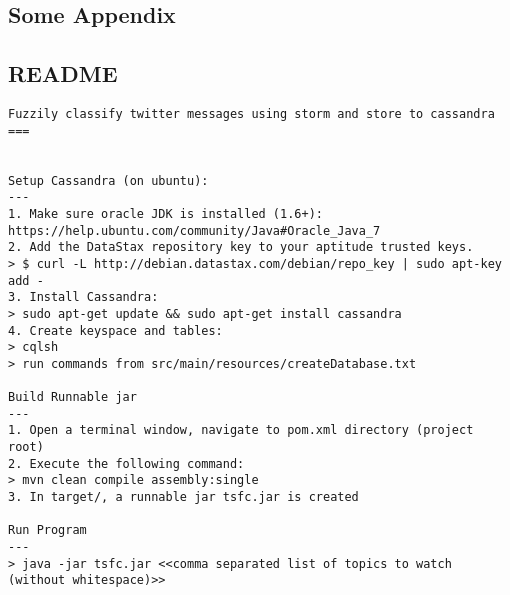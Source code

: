 \documentclass[a4paper]{report}
\begin{document}
\clearpage



\newpage
\begin{appendices}
\chapter{Some Appendix}


\section{README}
\begin{lstlisting}
Fuzzily classify twitter messages using storm and store to cassandra
===


Setup Cassandra (on ubuntu):
---
1. Make sure oracle JDK is installed (1.6+): https://help.ubuntu.com/community/Java#Oracle_Java_7
2. Add the DataStax repository key to your aptitude trusted keys.
> $ curl -L http://debian.datastax.com/debian/repo_key | sudo apt-key add -
3. Install Cassandra:
> sudo apt-get update && sudo apt-get install cassandra
4. Create keyspace and tables:
> cqlsh
> run commands from src/main/resources/createDatabase.txt

Build Runnable jar
---
1. Open a terminal window, navigate to pom.xml directory (project root)
2. Execute the following command:
> mvn clean compile assembly:single
3. In target/, a runnable jar tsfc.jar is created

Run Program
---
> java -jar tsfc.jar <<comma separated list of topics to watch (without whitespace)>>
\end{lstlisting}

\end{appendices}
\end{document}

